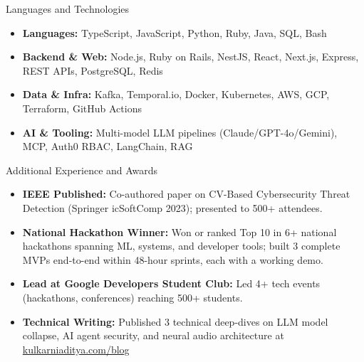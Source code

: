 \documentclass[]{mcdowellcv}
\begin{document}
\begin{cvsection}{Languages and Technologies}
  \begin{cvsubsection}{}{}{}
    \begin{itemize}
      \item \textbf{Languages:} TypeScript, JavaScript, Python, Ruby, Java, SQL, Bash
      \item \textbf{Backend \& Web:} Node.js, Ruby on Rails, NestJS, React, Next.js, Express, REST APIs, PostgreSQL, Redis
      \item \textbf{Data \& Infra:} Kafka, Temporal.io, Docker, Kubernetes, AWS, GCP, Terraform, GitHub Actions
      \item \textbf{AI \& Tooling:} Multi-model LLM pipelines (Claude/GPT-4o/Gemini), MCP, Auth0 RBAC, LangChain, RAG
    \end{itemize}
  \end{cvsubsection}
\end{cvsection}

\begin{cvsection}{Additional Experience and Awards}
  \begin{cvsubsection}{}{}{}
    \begin{itemize}
      \item \textbf{IEEE Published:} Co-authored paper on CV-Based Cybersecurity Threat Detection (Springer icSoftComp 2023); presented to 500+ attendees.
      \item \textbf{National Hackathon Winner:} Won or ranked Top 10 in 6+ national hackathons spanning ML, systems, and developer tools; built 3 complete MVPs end-to-end within 48-hour sprints, each with a working demo.
      \item \textbf{Lead at Google Developers Student Club:} Led 4+ tech events (hackathons, conferences) reaching 500+ students.
      \item \textbf{Technical Writing:} Published 3 technical deep-dives on LLM model collapse, AI agent security, and neural audio architecture at \href{https://www.kulkarniaditya.com/blog}{kulkarniaditya.com/blog}
    \end{itemize}
  \end{cvsubsection}
\end{cvsection}
\end{document}
